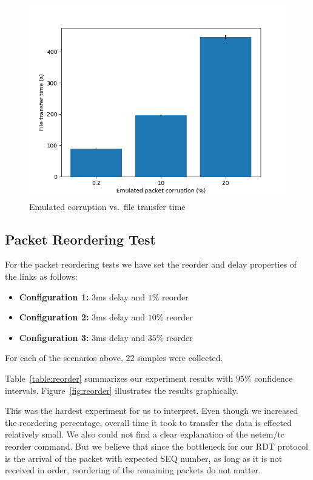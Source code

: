 \documentclass[conference]{IEEEtran}
\begin{document}
\begin{figure}
    \centering
    \includegraphics[scale=0.6]{graphics/plot-corruption}
    \caption{Emulated corruption vs.\ file transfer time}\label{fig:corruption}
\end{figure}

\subsection{Packet Reordering Test}\label{AA}

For the packet reordering tests we have set the reorder and delay properties of the links as follows:
\begin{itemize}
    \item \textbf{Configuration 1:} 3ms delay and $1\%$ reorder
    \item \textbf{Configuration 2:} 3ms delay and $10\%$ reorder
    \item \textbf{Configuration 3:} 3ms delay and $35\%$ reorder
\end{itemize}
For each of the scenarios above, 22 samples were collected.

Table~\ref{table:reorder} summarizes our experiment results with 95\% confidence intervals.
Figure~\ref{fig:reorder} illustrates the results graphically.

This was the hardest experiment for us to interpret. Even though we increased the reordering percentage, overall time it took to transfer the data is effected relatively small. We also could not find a clear explanation of the netem/tc reorder command. But we believe that since the bottleneck for our RDT protocol is the arrival of the packet with expected SEQ number, as long as it is not received in order, reordering of the remaining packets do not matter.
\end{document}
